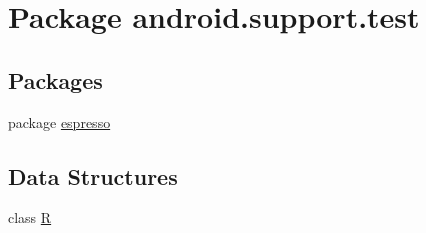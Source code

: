 \hypertarget{namespaceandroid_1_1support_1_1test}{}\section{Package android.\+support.\+test}
\label{namespaceandroid_1_1support_1_1test}
\subsection*{Packages}
\begin{DoxyCompactItemize}
\item 
package \mbox{\hyperlink{namespaceandroid_1_1support_1_1test_1_1espresso}{espresso}}
\end{DoxyCompactItemize}
\subsection*{Data Structures}
\begin{DoxyCompactItemize}
\item 
class \mbox{\hyperlink{classandroid_1_1support_1_1test_1_1_r}{R}}
\end{DoxyCompactItemize}
